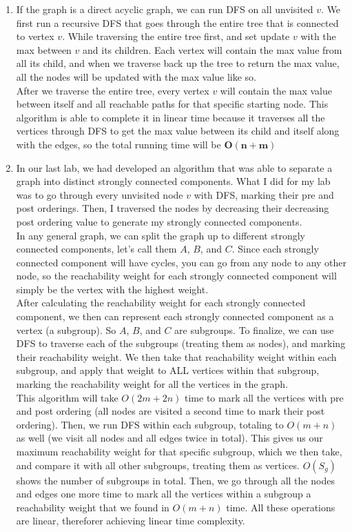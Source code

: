 \documentclass{article}
\begin{document}
\begin{enumerate}
        \begin{enumerate}
            \item If the graph is a direct acyclic graph, we can run DFS on all unvisited $v$. We first run a recursive DFS that goes through the entire tree that is connected to vertex $v$. While traversing the entire tree first, and set update $v$ with the max between $v$ and its children. Each vertex will contain the max value from all its child, and when we traverse back up the tree to return the max value, all the nodes will be updated with the max value like so.\\
            After we traverse the entire tree, every vertex $v$ will contain the max value between itself and all reachable paths for that specific starting node. This algorithm is able to complete it in linear time because it traverses all the vertices through DFS to get the max value between its child and itself along with the edges, so the total running time will be $\boxed{\mathbf{O(n + m)}}$
            \item In our last lab, we had developed an algorithm that was able to separate a graph into distinct strongly connected components. What I did for my lab was to go through every unvisited node $v$ with DFS, marking their pre and post orderings. Then, I traversed the nodes by decreasing their decreasing post ordering value to generate my strongly connected components.\\
            In any general graph, we can split the graph up to different strongly connected components, let's call them $A$, $B$, and $C$. Since each strongly connected component will have cycles, you can go from any node to any other node, so the reachability weight for each strongly connected component will simply be the vertex with the highest weight.\\
            After calculating the reachability weight for each strongly connected component, we then can represent each strongly connected component as a vertex (a subgroup). So $A$, $B$, and $C$ are subgroups. To finalize, we can use DFS to traverse each of the subgroups (treating them as nodes), and marking their reachability weight. We then take that reachability weight within each subgroup, and apply that weight to ALL vertices within that subgroup, marking the reachability weight for all the vertices in the graph.\\
            This algorithm will take $O(2m + 2n)$ time to mark all the vertices with pre and post ordering (all nodes are visited a second time to mark their post ordering). Then, we run DFS within each subgroup, totaling to $O(m + n)$ as well (we visit all nodes and all edges twice in total). This gives us our maximum reachability weight for that specific subgroup, which we then take, and compare it with all other subgroups, treating them as vertices. $O(S_g)$ shows the number of subgroups in total. Then, we go through all the nodes and edges one more time to mark all the vertices within a subgroup a reachability weight that we found in $O(m + n)$ time. All these operations are linear, thereforer achieving linear time complexity.
        \end{enumerate}

        
    \end{enumerate} 
\end{document}
